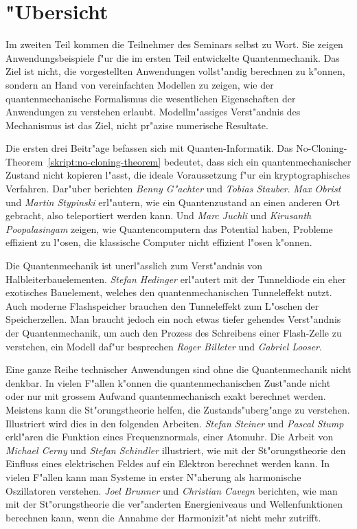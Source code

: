 \chapter*{"Ubersicht}
\rhead{}
Im zweiten Teil kommen die Teilnehmer des Seminars selbst zu Wort.
Sie zeigen Anwendungsbeispiele f"ur die im ersten
Teil entwickelte Quantenmechanik.
Das Ziel ist nicht, die vorgestellten Anwendungen vollst"andig
berechnen zu k"onnen, sondern an Hand von vereinfachten Modellen
zu zeigen, wie der quantenmechanische Formalismus die wesentlichen
Eigenschaften der Anwendungen zu verstehen erlaubt.
Modellm"assiges Verst"andnis des Mechanismus ist das Ziel, nicht pr"azise
numerische Resultate.

Die ersten drei Beitr"age befassen sich mit Quanten-Informatik.
Das No-Cloning-Theorem~\ref{skript:no-cloning-theorem} bedeutet,
dass sich ein quantenmechanischer
Zustand nicht kopieren l"asst, die ideale Voraussetzung f"ur ein
kryptographisches Verfahren.
Dar"uber berichten {\em Benny G"achter} und {\em Tobias Stauber}.
{\em Max Obrist} und {\em Martin Stypinski} erl"autern, wie ein Quantenzustand
an einen anderen Ort gebracht, also teleportiert werden kann.
Und {\em Marc Juchli} und {\em Kirusanth Poopalasingam} zeigen,
wie Quantencomputern
das Potential haben, Probleme effizient zu l"osen, die klassische 
Computer nicht effizient l"osen k"onnen.

Die Quantenmechanik ist unerl"asslich zum Verst"andnis von
Halbleiterbauelementen.
{\em Stefan Hedinger} erl"autert mit der Tunneldiode
ein eher exotisches Bauelement, welches den quantenmechanischen
Tunneleffekt nutzt.
Auch moderne Flashspeicher brauchen den Tunneleffekt zum L"oschen 
der Speicherzellen.
Man braucht jedoch ein noch etwas tiefer gehendes Verst"andnis der
Quantenmechanik,
um auch den Prozess des Schreibens einer Flash-Zelle zu verstehen, ein
Modell daf"ur besprechen {\em Roger Billeter} und {\em Gabriel Looser}.

Eine ganze Reihe technischer Anwendungen sind ohne die Quantenmechanik
nicht denkbar.
In vielen F"allen k"onnen die quantenmechanischen Zust"ande nicht oder nur
mit grossem Aufwand quantenmechanisch exakt berechnet werden.
Meistens kann die St"orungstheorie helfen, die Zustands"uberg"ange
zu verstehen.
Illustriert wird dies in den folgenden Arbeiten.
{\em Stefan Steiner} und {\em Pascal Stump} erkl"aren die Funktion eines
Frequenznormals, einer Atomuhr. 
Die Arbeit von
{\em Michael Cerny} und {\em Stefan Schindler} illustriert, wie mit der
St"orungstheorie den Einfluss eines elektrischen Feldes auf ein
Elektron berechnet werden kann.
In vielen F"allen kann man Systeme in erster N"aherung als harmonische
Oszillatoren verstehen. {\em Joel Brunner} und {\em Christian Cavegn} berichten,
wie man mit der St"orungstheorie die ver"anderten Energieniveaus und
Wellenfunktionen berechnen kann,
wenn die Annahme der Harmonizit"at nicht mehr zutrifft.

